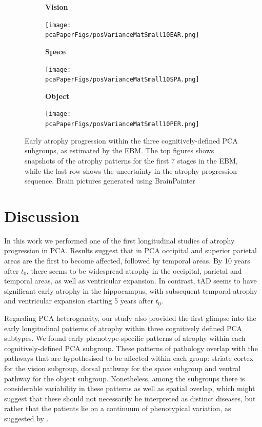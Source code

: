 \begin{figure}
  
 \begin{subfigure}{0.32\textwidth}
 \centering
 {\footnotesize \textbf{Vision}\par}
 \texttt{[image: \\pcaPaperFigs/posVarianceMatSmall10EAR.png]}
 \end{subfigure}
  \begin{subfigure}{0.32\textwidth}
  \centering
  {\footnotesize \textbf{Space}\par}
 \texttt{[image: \\pcaPaperFigs/posVarianceMatSmall10SPA.png]}
 \end{subfigure}
  \begin{subfigure}{0.32\textwidth}
  \centering
  {\footnotesize \textbf{Object}\par}
 \texttt{[image: \\pcaPaperFigs/posVarianceMatSmall10PER.png]}
 \end{subfigure}
 \caption[Early atrophy progression within the three cognitively-defined PCA subgroups]{Early atrophy progression within the three cognitively-defined PCA subgroups, as estimated by the EBM. The top figures shows snapshots of the atrophy patterns for the first 7 stages in the EBM, while the last row shows the uncertainty in the atrophy progression sequence. Brain pictures generated using BrainPainter \cite{marinescu2019BrainPainter}}
 \label{fig:pcaSubgrSnap}
\end{figure}

\section{Discussion}
\label{sec:pcaDis}

In this work we performed one of the first longitudinal studies of atrophy progression in PCA. Results suggest that in PCA occipital and superior parietal areas are the first to become affected, followed by temporal areas. By 10 years after $t_0$, there seems to be widespread atrophy in the occipital, parietal and temporal areas, as well as ventricular expansion. In contrast, tAD seems to have significant early atrophy in the hippocampus, with subsequent temporal atrophy and ventricular expansion starting 5 years after $t_0$. 

Regarding PCA heterogeneity, our study also provided the first glimpse into the early longitudinal patterns of atrophy within three cognitively defined PCA subtypes. We found early phenotype-specific patterns of atrophy within each cognitively-defined PCA subgroup. These patterns of pathology overlap with the pathways that are hypothesised to be affected within each group: striate cortex for the vision subgroup, dorsal pathway for the space subgroup and ventral pathway for the object subgroup. Nonetheless, among the subgroups there is considerable variability in these patterns as well as spatial overlap, which might suggest that these should not necessarily be interpreted as distinct diseases, but rather that the patients lie on a continuum of phenotypical variation, as suggested by \cite{lehmann2011basic}. 

